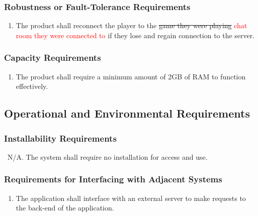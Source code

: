\documentclass[12pt, titlepage]{article}
\begin{document}
    \subsubsection{Robustness or Fault-Tolerance Requirements}
    \begin{enumerate}[{PR}1., leftmargin=2\parindent, resume]
    	\item The product shall reconnect the player to the \sout{game they were playing} \textcolor{red}{chat room they were connected to} if they lose and regain connection to the server.
    \end{enumerate}
    
    \subsubsection{Capacity Requirements}
    \begin{enumerate}[{PR}1., leftmargin=2\parindent, resume]
    	\item The product shall require a minimum amount of 2GB of RAM to function effectively.
    \end{enumerate}
    
    \subsection{Operational and Environmental Requirements}
    
    \subsubsection{Installability Requirements}
    \ N/A. The system shall require no installation for access and use.
    
    \subsubsection{Requirements for Interfacing with Adjacent Systems}
    \begin{enumerate}[{OE}1., leftmargin=2\parindent]
        \item The application shall interface with an external server to make requests to the back-end of the application.
    \end{enumerate}
    
\end{document}
